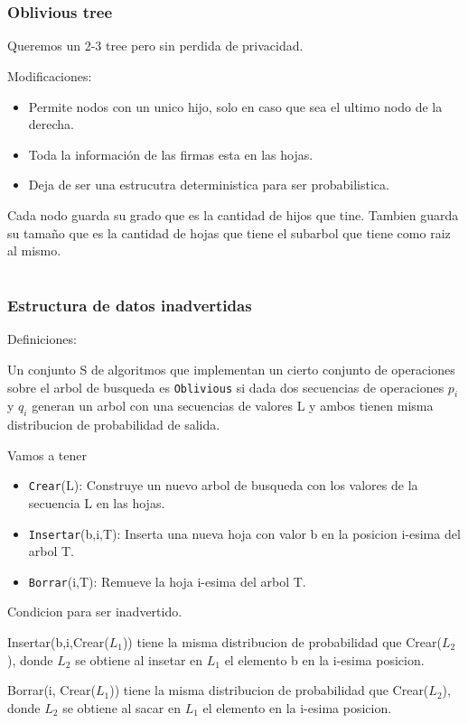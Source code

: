 \documentclass[10pt,handout]{beamer}
\begin{document}

\section{}
\begin{frame}
\frametitle{Oblivious tree}

Queremos un 2-3 tree pero sin perdida de privacidad.

Modificaciones:
\begin{itemize}
  \item Permite nodos con un unico hijo, solo en caso que sea el ultimo nodo de la derecha.
  \item Toda la información de las firmas esta en las hojas.
  \item Deja de ser una estrucutra deterministica para ser probabilistica.
\end{itemize}

Cada nodo guarda su grado que es la cantidad de hijos que tine.
Tambien guarda su tamaño que es la cantidad de hojas que tiene el subarbol que tiene como
raiz al mismo.
\end{frame}



\section{}
\begin{frame}
\frametitle{Estructura de datos inadvertidas}

Definiciones:

Un conjunto S de algoritmos que implementan un cierto conjunto de operaciones sobre el arbol de busqueda es
\texttt{Oblivious} si dada dos secuencias de operaciones $p_i$ y $q_i$ generan un arbol con una secuencias
de valores L y ambos tienen misma distribucion de probabilidad de salida.


Vamos a tener
\begin{itemize}
  \item \texttt{Crear}(L): Construye un nuevo arbol de busqueda con los valores de la secuencia L en las hojas.
  \item \texttt{Insertar}(b,i,T): Inserta una nueva hoja con valor b en la posicion i-esima del arbol T.
  \item \texttt{Borrar}(i,T): Remueve la hoja i-esima del arbol T.
\end{itemize}

Condicion para ser inadvertido.

Insertar(b,i,Crear($L_1$)) tiene la misma distribucion de probabilidad que Crear($L_2$), donde $L_{2}$
se obtiene al insetar en $L_{1}$ el elemento b en la i-esima posicion.

Borrar(i, Crear($L_{1}$)) tiene la misma distribucion de probabilidad que Crear($L_2$), donde $L_{2}$
se obtiene al sacar en $L_{1}$ el elemento en la i-esima posicion.


\end{frame}
\end{document}
